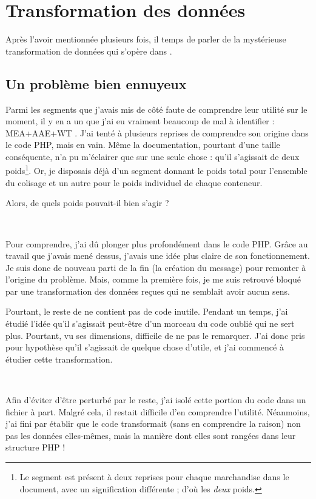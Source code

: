 \section{Transformation des données}
\label{transformation_donnees}

Après l'avoir mentionnée plusieurs fois, il temps de parler de la mystérieuse transformation de données qui s'opère dans \pireus.


\subsection{Un problème bien ennuyeux}
Parmi les segments que j'avais mis de côté faute de comprendre leur utilité sur le moment, il y en a un que j'ai eu vraiment beaucoup de mal à identifier : \og MEA+AAE+WT \fg. J'ai tenté à plusieurs reprises de comprendre son origine dans le code PHP, mais en vain. Même la documentation, pourtant d'une taille conséquente, n'a pu m'éclairer que sur une seule chose : qu'il s'agissait de deux poids\footnote{Le segment est présent à deux reprises pour chaque marchandise dans le document, avec un signification différente ; d'où les \emph{deux} poids.}. Or, je disposais déjà d'un segment donnant le poids total pour l'ensemble du colisage et un autre pour le poids individuel de chaque conteneur.

Alors, de quels poids pouvait-il bien s'agir ?

~

Pour comprendre, j'ai dû plonger plus profondément dans le code PHP. Grâce au travail que j'avais mené dessus, j'avais une idée plus claire de son fonctionnement. Je suis donc de nouveau parti de la fin (la création du message) pour remonter à l'origine du problème. Mais, comme la première fois, je me suis retrouvé bloqué par une transformation des données reçues qui ne semblait avoir aucun sens.

Pourtant, le reste de \pireus{} ne contient pas de code inutile. Pendant un temps, j'ai étudié l'idée qu'il s'agissait peut-être d'un morceau du code oublié qui ne sert plus. Pourtant, vu ses dimensions, difficile de ne pas le remarquer. J'ai donc pris pour hypothèse qu'il s'agissait de quelque chose d'utile, et j'ai commencé à étudier cette transformation.

~

Afin d'éviter d'être perturbé par le reste, j'ai isolé cette portion du code dans un fichier à part. Malgré cela, il restait difficile d'en comprendre l'utilité. Néanmoins, j'ai fini par établir que le code transformait (sans en comprendre la raison) non pas les données elles-mêmes, mais la manière dont elles sont rangées dans leur structure PHP !

